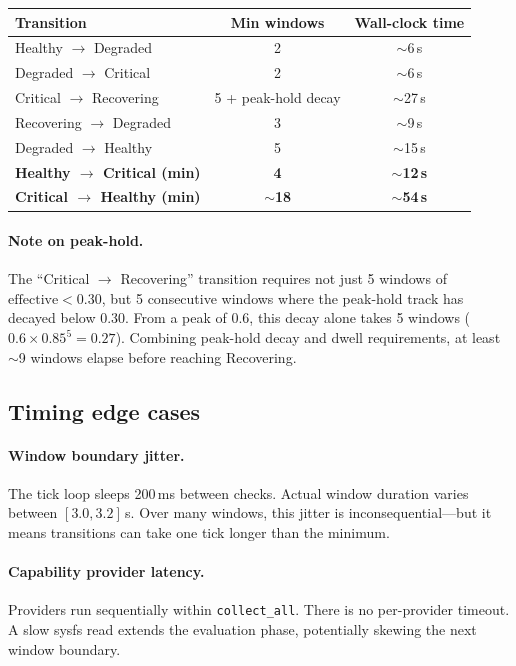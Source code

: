 \documentclass[11pt]{article}
\begin{document}
\begin{center}
\begin{tabular}{lcc}
\toprule
Transition & Min windows & Wall-clock time \\
\midrule
Healthy $\rightarrow$ Degraded & 2 & $\sim$6\,s \\
Degraded $\rightarrow$ Critical & 2 & $\sim$6\,s \\
Critical $\rightarrow$ Recovering & 5 + peak-hold decay & $\sim$27\,s \\
Recovering $\rightarrow$ Degraded & 3 & $\sim$9\,s \\
Degraded $\rightarrow$ Healthy & 5 & $\sim$15\,s \\
\midrule
\textbf{Healthy $\rightarrow$ Critical (min)} & \textbf{4} & $\mathbf{\sim}$\textbf{12\,s} \\
\textbf{Critical $\rightarrow$ Healthy (min)} & \textbf{$\sim$18} & $\mathbf{\sim}$\textbf{54\,s} \\
\bottomrule
\end{tabular}
\end{center}

\paragraph{Note on peak-hold.}
The ``Critical $\rightarrow$ Recovering'' transition requires not just 5
windows of $\text{effective} < 0.30$, but 5 consecutive windows where the
peak-hold track has decayed below 0.30. From a peak of 0.6, this decay
alone takes 5 windows ($0.6 \times 0.85^5 = 0.27$). Combining peak-hold
decay and dwell requirements, at least $\sim$9 windows elapse before
reaching Recovering.

\subsection{Timing edge cases}

\paragraph{Window boundary jitter.}
The tick loop sleeps 200\,ms between checks. Actual window duration varies
between $[3.0, 3.2]$\,s. Over many windows, this jitter is
inconsequential---but it means transitions can take one tick longer than
the minimum.

\paragraph{Capability provider latency.}
Providers run sequentially within \texttt{collect\_all}. There is no
per-provider timeout. A slow sysfs read extends the evaluation phase,
potentially skewing the next window boundary.
\end{document}
